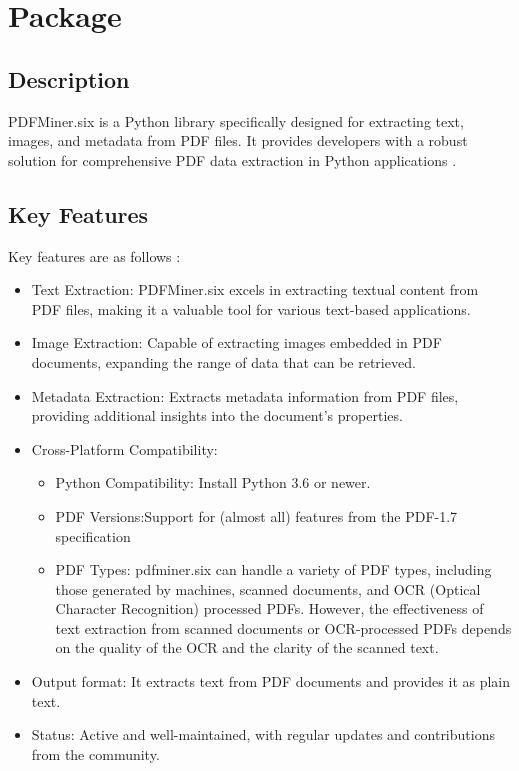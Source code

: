 %
%
%
%

\chapter{Package } %

\section{Description}

PDFMiner.six is a Python library specifically designed for extracting text, images, and metadata from PDF files. It provides developers with a robust solution for comprehensive PDF data extraction in Python applications \cite{pdfminersix:2024}.

\section{Key Features}

Key features are as follows \cite{pdfminersix:2024}: 

\begin{itemize}
    \item Text Extraction: PDFMiner.six excels in extracting textual content from PDF files, making it a valuable tool for various text-based applications.
    \item Image Extraction: Capable of extracting images embedded in PDF documents, expanding the range of data that can be retrieved.
    \item Metadata Extraction: Extracts metadata information from PDF files, providing additional insights into the document's properties.
    \item Cross-Platform Compatibility: 
    \begin{itemize}
    \item Python Compatibility: Install Python 3.6 or newer.
    \item PDF Versions:Support for (almost all) features from the PDF-1.7 specification
    \item PDF Types: pdfminer.six can handle a variety of PDF types, including those generated by machines, scanned documents, and OCR (Optical Character Recognition) processed PDFs. However, the effectiveness of text extraction from scanned documents or OCR-processed PDFs depends on the quality of the OCR and the clarity of the scanned text.
    \end{itemize}
    \item Output format: It extracts text from PDF documents and provides it as plain text.
    \item Status: Active and well-maintained, with regular updates and contributions from the community.
\end{itemize}

